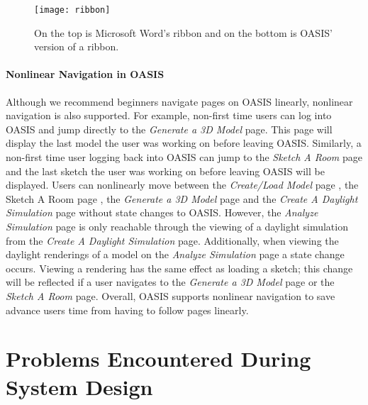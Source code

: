 \begin{figure}[!ht]
\centering
\caption{On the top is Microsoft Word's ribbon and on the bottom is OASIS' version of a ribbon.}
\label{fig:ribbon}
\texttt{[image: ribbon]}
\end{figure}

\paragraph{Nonlinear Navigation in OASIS}
Although we recommend beginners navigate pages on OASIS linearly, nonlinear navigation is also supported. For example, non-first time users can log into OASIS and jump directly to the \textit{Generate a 3D Model} page. This page will display the last model the user was working on before leaving OASIS. Similarly, a non-first time user logging back into OASIS can jump to the \textit{Sketch A Room} page and the last sketch the user was working on before leaving OASIS will be displayed. 
Users can nonlinearly move between the \textit{Create/Load Model} page ,  the {Sketch A Room} page , the \textit{Generate a 3D Model} page and the \textit{Create A Daylight Simulation} page without state changes to OASIS. However, the \textit{Analyze Simulation} page is only reachable through the viewing of a daylight simulation from the \textit{Create A Daylight Simulation} page. Additionally, when viewing the daylight renderings of a model on the \textit{Analyze Simulation} page a state change occurs. Viewing a rendering has the same effect as loading a sketch; this change will be reflected if a user navigates to the \textit{Generate a 3D Model} page or the \textit{Sketch A Room} page. Overall, OASIS supports nonlinear navigation to save advance users time from having to follow pages linearly.


\section{Problems Encountered During System Design}

